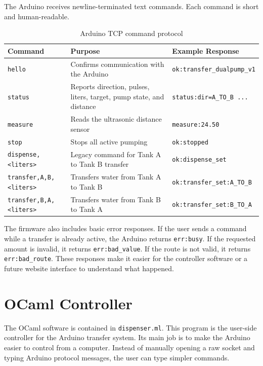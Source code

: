The Arduino receives newline-terminated text commands. Each command is short and human-readable.

\begin{table}[H]
\centering
\begin{tabular}{lll}
\toprule
\textbf{Command} & \textbf{Purpose} & \textbf{Example Response} \\
\midrule
\texttt{hello} & Confirms communication with the Arduino & \texttt{ok:transfer\_dualpump\_v1} \\
\texttt{status} & Reports direction, pulses, liters, target, pump state, and distance & \texttt{status:dir=A\_TO\_B ...} \\
\texttt{measure} & Reads the ultrasonic distance sensor & \texttt{measure:24.50} \\
\texttt{stop} & Stops all active pumping & \texttt{ok:stopped} \\
\texttt{dispense,<liters>} & Legacy command for Tank A to Tank B transfer & \texttt{ok:dispense\_set} \\
\texttt{transfer,A,B,<liters>} & Transfers water from Tank A to Tank B & \texttt{ok:transfer\_set:A\_TO\_B} \\
\texttt{transfer,B,A,<liters>} & Transfers water from Tank B to Tank A & \texttt{ok:transfer\_set:B\_TO\_A} \\
\bottomrule
\end{tabular}
\caption{Arduino TCP command protocol}
\end{table}

The firmware also includes basic error responses. If the user sends a command while a transfer is already active, the Arduino returns \texttt{err:busy}. If the requested amount is invalid, it returns \texttt{err:bad\_value}. If the route is not valid, it returns \texttt{err:bad\_route}. These responses make it easier for the controller software or a future website interface to understand what happened.

\section{OCaml Controller}

The OCaml software is contained in \texttt{dispenser.ml}. This program is the user-side controller for the Arduino transfer system. Its main job is to make the Arduino easier to control from a computer. Instead of manually opening a raw socket and typing Arduino protocol messages, the user can type simpler commands.

